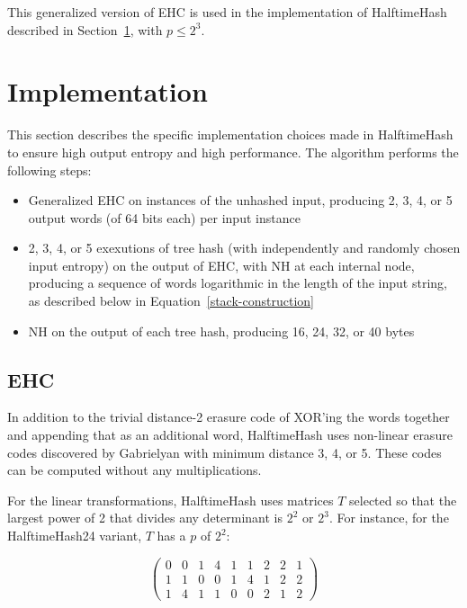 \documentclass[runningheads]{llncs}
\begin{document}
This generalized version of EHC is used in the implementation of HalftimeHash described in Section~\ref{implementation}, with $p \le 2^3$.

\section{Implementation}
\label{implementation}

This section describes the specific implementation choices made in HalftimeHash to ensure high output entropy and high performance.
The algorithm performs the following steps:

\begin{itemize}
\item Generalized EHC on instances of the unhashed input, producing 2, 3, 4, or 5 output words (of 64 bits each) per input instance
\item 2, 3, 4, or 5 exexutions of tree hash (with independently and randomly chosen input entropy) on the output of EHC, with NH at each internal node, producing a sequence of words logarithmic in the length of the input string, as described below in Equation~\ref{stack-construction}
\item NH on the output of each tree hash, producing 16, 24, 32, or 40 bytes
\end{itemize}

\subsection{EHC}

In addition to the trivial distance-2 erasure code of XOR'ing the words together and appending that as an additional word, HalftimeHash uses non-linear erasure codes discovered by Gab\-ri\-el\-yan with minimum distance 3, 4, or 5. \cite{10-7-erasure-code,9-5-erasure-code,9-7-erasure-code}
These codes can be computed without any multiplications.

For the linear transformations, HalftimeHash uses matrices $T$ selected so that the largest power of 2 that divides any determinant is $2^2$ or $2^3$.
For instance, for the HalftimeHash24 variant, $T$ has a $p$ of $2^2$:

\begin{displaymath}
  \left(
\begin{array}{rrrrrrrrr}
  0 & 0 & 1 & 4 & 1 & 1 & 2 & 2 & 1\\
  1 & 1 & 0 & 0 & 1 & 4 & 1 & 2 & 2\\
  1 & 4 & 1 & 1 & 0 & 0 & 2 & 1 & 2
\end{array}
\right)
\end{displaymath}
\end{document}
